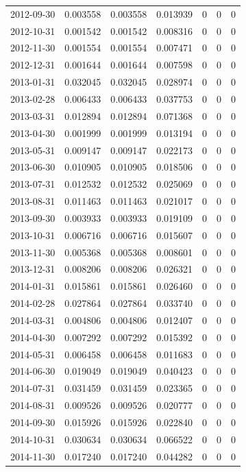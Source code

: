 \documentclass[conference,onecolumn]{IEEEtran}
\begin{document}
\begin{longtable}{|c|c|c|c|c|c|c|}
2012-09-30 & 0.003558 & 0.003558 & 0.013939 & 0 & 0 & 0 \\
2012-10-31 & 0.001542 & 0.001542 & 0.008316 & 0 & 0 & 0 \\
2012-11-30 & 0.001554 & 0.001554 & 0.007471 & 0 & 0 & 0 \\
2012-12-31 & 0.001644 & 0.001644 & 0.007598 & 0 & 0 & 0 \\
2013-01-31 & 0.032045 & 0.032045 & 0.028974 & 0 & 0 & 0 \\
2013-02-28 & 0.006433 & 0.006433 & 0.037753 & 0 & 0 & 0 \\
2013-03-31 & 0.012894 & 0.012894 & 0.071368 & 0 & 0 & 0 \\
2013-04-30 & 0.001999 & 0.001999 & 0.013194 & 0 & 0 & 0 \\
2013-05-31 & 0.009147 & 0.009147 & 0.022173 & 0 & 0 & 0 \\
2013-06-30 & 0.010905 & 0.010905 & 0.018506 & 0 & 0 & 0 \\
2013-07-31 & 0.012532 & 0.012532 & 0.025069 & 0 & 0 & 0 \\
2013-08-31 & 0.011463 & 0.011463 & 0.021017 & 0 & 0 & 0 \\
2013-09-30 & 0.003933 & 0.003933 & 0.019109 & 0 & 0 & 0 \\
2013-10-31 & 0.006716 & 0.006716 & 0.015607 & 0 & 0 & 0 \\
2013-11-30 & 0.005368 & 0.005368 & 0.008601 & 0 & 0 & 0 \\
2013-12-31 & 0.008206 & 0.008206 & 0.026321 & 0 & 0 & 0 \\
2014-01-31 & 0.015861 & 0.015861 & 0.026460 & 0 & 0 & 0 \\
2014-02-28 & 0.027864 & 0.027864 & 0.033740 & 0 & 0 & 0 \\
2014-03-31 & 0.004806 & 0.004806 & 0.012407 & 0 & 0 & 0 \\
2014-04-30 & 0.007292 & 0.007292 & 0.015392 & 0 & 0 & 0 \\
2014-05-31 & 0.006458 & 0.006458 & 0.011683 & 0 & 0 & 0 \\
2014-06-30 & 0.019049 & 0.019049 & 0.040423 & 0 & 0 & 0 \\
2014-07-31 & 0.031459 & 0.031459 & 0.023365 & 0 & 0 & 0 \\
2014-08-31 & 0.009526 & 0.009526 & 0.020777 & 0 & 0 & 0 \\
2014-09-30 & 0.015926 & 0.015926 & 0.022840 & 0 & 0 & 0 \\
2014-10-31 & 0.030634 & 0.030634 & 0.066522 & 0 & 0 & 0 \\
2014-11-30 & 0.017240 & 0.017240 & 0.044282 & 0 & 0 & 0 \\

\end{longtable}
\end{document}
